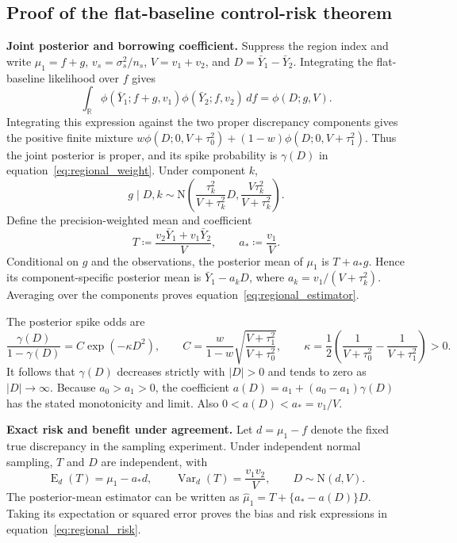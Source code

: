 \documentclass[11pt]{article}
\newcommand{\E}{\operatorname{E}}
\newcommand{\Var}{\operatorname{Var}}
\newcommand{\N}{\mathrm{N}}
\theoremstyle{remark}\newtheorem{remark}{Remark}[section]
\providecommand{\DIFaddtex}[1]{{\protect\color{blue} \sf #1}} %
\providecommand{\DIFaddbegin}{} %
\providecommand{\DIFaddend}{} %
\providecommand{\DIFadd}[1]{\texorpdfstring{\DIFaddtex{#1}}{#1}} %
\begin{document}
\subsection{Proof of  \DIFaddbegin \DIFadd{the flat-baseline control-risk theorem}\DIFaddend }\label{sec:C.3}
\noindent\textbf{Joint posterior and borrowing coefficient.}
Suppress the region index and write $\mu_1=f+g$, $v_s=\sigma_s^2/n_s$, $V=v_1+v_2$, and $D=\bar Y_1-\bar Y_2$. Integrating the flat-baseline likelihood over $f$ gives
\begin{equation}\label{eq:regional_flat_integral}
\int_{\mathbb R}\phi(\bar Y_1;f+g,v_1)\phi(\bar Y_2;f,v_2)\,df
=\phi(D;g,V).
\end{equation}
Integrating this expression against the two proper discrepancy components gives the positive finite mixture $w\phi(D;0,V+\tau_0^2)+(1-w)\phi(D;0,V+\tau_1^2)$. Thus the joint posterior is proper, and its spike probability is $\gamma(D)$ in  \DIFaddbegin \DIFadd{equation~\eqref{eq:regional_weight}}\DIFaddend . Under component $k$,
\[
g\mid D,k\sim\N\!\left(\frac{\tau_k^2}{V+\tau_k^2}D,
\frac{V\tau_k^2}{V+\tau_k^2}\right).
\]
Define the precision-weighted mean and coefficient
\begin{equation}\label{eq:regional_T}
T\coloneqq\frac{v_2\bar Y_1+v_1\bar Y_2}{V},\qquad a_*\coloneqq\frac{v_1}{V}.
\end{equation}
Conditional on $g$ and the observations, the posterior mean of $\mu_1$ is $T+a_*g$. Hence its component-specific posterior mean is $\bar Y_1-a_kD$, where $a_k=v_1/(V+\tau_k^2)$. Averaging over the components proves  \DIFaddbegin \DIFadd{equation~\eqref{eq:regional_estimator}}\DIFaddend .

The posterior spike odds are
\begin{equation}\label{eq:regional_odds}
\frac{\gamma(D)}{1-\gamma(D)}
=C\exp(-\kappa D^2),\qquad
C=\frac{w}{1-w}\sqrt{\frac{V+\tau_1^2}{V+\tau_0^2}},\qquad
\kappa=\frac{1}{2}\left(\frac{1}{V+\tau_0^2}-\frac{1}{V+\tau_1^2}\right)>0.
\end{equation}
It follows that $\gamma(D)$ decreases strictly with $|D|>0$ and tends to zero as $|D|\to\infty$. Because $a_0>a_1>0$, the coefficient $a(D)=a_1+(a_0-a_1)\gamma(D)$ has the stated monotonicity and limit. Also $0<a(D)<a_*=v_1/V$.

\noindent\textbf{Exact risk and benefit under agreement.}
Let $d=\mu_1-f$ denote the fixed true discrepancy in the sampling experiment. Under independent normal sampling, $T$ and $D$ are independent, with
\begin{equation}\label{eq:regional_T_distribution}
\E_d(T)=\mu_1-a_*d,\qquad
\Var_d(T)=\frac{v_1v_2}{V},\qquad D\sim\N(d,V).
\end{equation}
The posterior-mean estimator can be written as $\widehat\mu_1=T+\{a_*-a(D)\}D$. Taking its expectation or squared error proves the bias and risk expressions in  \DIFaddbegin \DIFadd{equation~\eqref{eq:regional_risk}}\DIFaddend .
\end{document}
